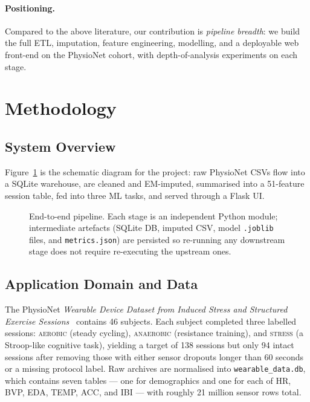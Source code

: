 \documentclass[sigconf,nonacm]{acmart}
\begin{document}
\paragraph{Positioning.}
Compared to the above literature, our contribution is \emph{pipeline
breadth}: we build the full ETL, imputation, feature engineering,
modelling, and a deployable web front-end on the PhysioNet cohort,
with depth-of-analysis experiments on each stage.

\section{Methodology}
\label{sec:method}

\subsection{System Overview}
Figure~\ref{fig:pipeline} is the schematic diagram for the project:
raw PhysioNet CSVs flow into a SQLite warehouse, are cleaned and EM-imputed,
summarised into a 51-feature session table, fed into three ML tasks,
and served through a Flask UI.

\begin{figure}[t]
\centering
{}
\caption{End-to-end pipeline. Each stage is an independent Python
module; intermediate artefacts (SQLite DB, imputed CSV, model
\texttt{.joblib} files, and \texttt{metrics.json}) are persisted so
re-running any downstream stage does not require re-executing the
upstream ones.}
\label{fig:pipeline}
\end{figure}

\subsection{Application Domain and Data}
\label{sec:data}
The PhysioNet \emph{Wearable Device Dataset from Induced Stress and
Structured Exercise Sessions}~\cite{physionet} contains 46 subjects.
Each subject completed three labelled sessions:
\textsc{aerobic} (steady cycling), \textsc{anaerobic} (resistance
training), and \textsc{stress} (a Stroop-like cognitive task),
yielding a target of 138 sessions but only 94 intact sessions after
removing those with either sensor dropouts longer than 60 seconds or
a missing protocol label. Raw archives are normalised into
\texttt{wearable\_data.db}, which contains seven tables --- one for
demographics and one for each of HR, BVP, EDA, TEMP, ACC, and IBI ---
with roughly 21 million sensor rows total.
\end{document}
